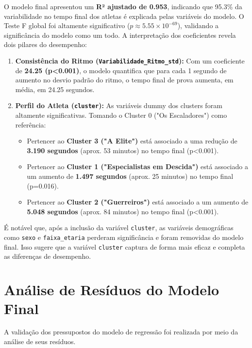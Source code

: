 O modelo final apresentou um \textbf{R² ajustado de 0.953}, indicando que 95.3\% da variabilidade no tempo final dos atletas é explicada pelas variáveis do modelo. O Teste F global foi altamente significativo ($p \approx 5.55 \times 10^{-69}$), validando a significância do modelo como um todo. A interpretação dos coeficientes revela dois pilares do desempenho:
\begin{enumerate}
    \item \textbf{Consistência do Ritmo (\texttt{Variabilidade\_Ritmo\_std}):} Com um coeficiente de \textbf{24.25 (p<0.001)}, o modelo quantifica que para cada 1 segundo de aumento no desvio padrão do ritmo, o tempo final de prova aumenta, em média, em 24.25 segundos.
    \item \textbf{Perfil do Atleta (\texttt{cluster}):} As variáveis dummy dos clusters foram altamente significativas. Tomando o Cluster 0 ("Os Escaladores") como referência:
    \begin{itemize}
        \item Pertencer ao \textbf{Cluster 3 ("A Elite")} está associado a uma redução de \textbf{3.190 segundos} (aprox. 53 minutos) no tempo final (p<0.001).
        \item Pertencer ao \textbf{Cluster 1 ("Especialistas em Descida")} está associado a um aumento de \textbf{1.497 segundos} (aprox. 25 minutos) no tempo final (p=0.016).
        \item Pertencer ao \textbf{Cluster 2 ("Guerreiros")} está associado a um aumento de \textbf{5.048 segundos} (aprox. 84 minutos) no tempo final (p<0.001).
    \end{itemize}
\end{enumerate}
É notável que, após a inclusão da variável \texttt{cluster}, as variáveis demográficas como \texttt{sexo} e \texttt{faixa\_etaria} perderam significância e foram removidas do modelo final. Isso sugere que a variável \texttt{cluster} captura de forma mais eficaz e completa as diferenças de desempenho.

\section{Análise de Resíduos do Modelo Final}

A validação dos pressupostos do modelo de regressão foi realizada por meio da análise de seus resíduos.


